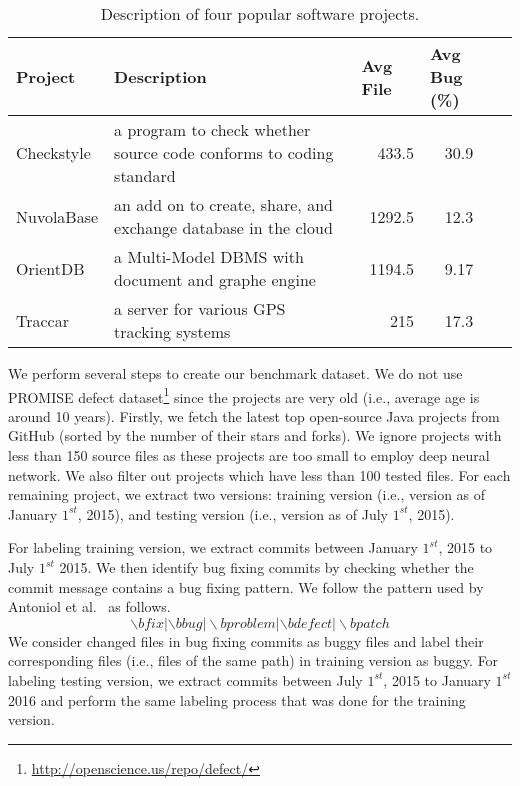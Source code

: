 \begin{table*}[t!]
	\centering
	\caption{Description of four popular software projects.}
	\begin{tabular}{|l|l|r|c|c|}
		\hline
		Project & \multicolumn{1}{l|}{Description}  & \multicolumn{1}{l|}{Avg File} & \multicolumn{1}{l|}{Avg Bug (\%)} \\
		\hline
		\hline
		Checkstyle  &  a program to check whether source code conforms to coding standard & 433.5 & 30.9 \\
		NuvolaBase &  an add on to create, share, and exchange database in the cloud     & 1292.5 & 12.3 \\
		OrientDB &  a Multi-Model DBMS with document and graphe engine  & 1194.5 & 9.17 \\
		Traccar &  a server for various GPS tracking systems & 215   & 17.3 \\
		\hline
	\end{tabular}%
	\label{tab:data}%
\end{table*}%

We perform several steps to create our benchmark dataset. {\color{red}We do not use PROMISE defect dataset\footnote{\url{http://openscience.us/repo/defect/}} since the projects are very old (i.e., average age is around 10 years)}. Firstly, we fetch the latest top open-source Java projects from GitHub (sorted by the number of their stars and forks). We ignore projects with less than 150 source files as these projects are too small to employ deep neural network. We also filter out projects which have less than 100 tested files. For each remaining project, we extract two versions: training version (i.e., version as of January $1^{st}$, 2015), and testing version (i.e., version as of July $1^{st}$, 2015). 

For labeling training version, we extract commits between January $1^{st}$, 2015 to July $1^{st}$ 2015. We then identify bug fixing commits by checking whether the commit message contains a bug fixing pattern. We follow the pattern used by Antoniol et al.~\cite{antoniol2008bug} as follows.
\[
\backslash bfix|\backslash bbug|\backslash bproblem|\backslash bdefect|\backslash bpatch
\]
We consider changed files in bug fixing commits as buggy files and label their corresponding files (i.e., files of the same path) in training version as buggy. For labeling testing version, we extract commits between July $1^{st}$, 2015 to January $1^{st}$ 2016 and perform the same labeling process that was done for the training version.

